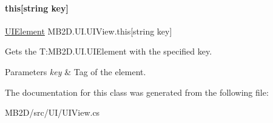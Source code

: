 \paragraph{\texorpdfstring{this[string key]}{this[string key]}}
{\footnotesize\ttfamily \hyperlink{class_m_b2_d_1_1_u_i_1_1_u_i_element}{U\+I\+Element} M\+B2\+D.\+U\+I.\+U\+I\+View.\+this\mbox{[}string key\mbox{]}\hspace{0.3cm}{\ttfamily [get]}}



Gets the T\+:\+M\+B2\+D.\+U\+I.\+U\+I\+Element with the specified key. 


\begin{DoxyParams}{Parameters}
{\em key} & Tag of the element.\\
\hline
\end{DoxyParams}


The documentation for this class was generated from the following file\+:\begin{DoxyCompactItemize}
\item 
M\+B2\+D/src/\+U\+I/U\+I\+View.\+cs\end{DoxyCompactItemize}
